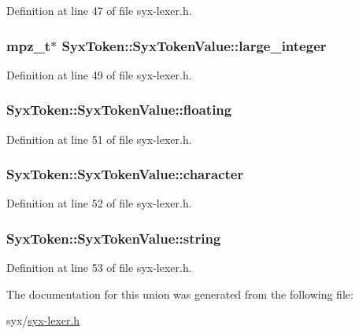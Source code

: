 Definition at line 47 of file syx-lexer.h.\hypertarget{union_syx_token_1_1_syx_token_value_746b44169806ed1ce69f218acdfd96a8}{
\subsubsection{\setlength{\rightskip}{0pt plus 5cm}mpz\_\-t$\ast$ SyxToken::SyxTokenValue::large\_\-integer}}
\label{union_syx_token_1_1_syx_token_value_746b44169806ed1ce69f218acdfd96a8}




Definition at line 49 of file syx-lexer.h.\hypertarget{union_syx_token_1_1_syx_token_value_8095519ab2c784b2b293d542c5da5a8d}{
\subsubsection{ SyxToken::SyxTokenValue::floating}}
\label{union_syx_token_1_1_syx_token_value_8095519ab2c784b2b293d542c5da5a8d}




Definition at line 51 of file syx-lexer.h.\hypertarget{union_syx_token_1_1_syx_token_value_4fa2b3de43d0695fd219dee73801d20e}{
\subsubsection{ SyxToken::SyxTokenValue::character}}
\label{union_syx_token_1_1_syx_token_value_4fa2b3de43d0695fd219dee73801d20e}




Definition at line 52 of file syx-lexer.h.\hypertarget{union_syx_token_1_1_syx_token_value_5470a0f27530896e0f104d948124df1c}{
\subsubsection{ SyxToken::SyxTokenValue::string}}
\label{union_syx_token_1_1_syx_token_value_5470a0f27530896e0f104d948124df1c}




Definition at line 53 of file syx-lexer.h.

The documentation for this union was generated from the following file:\begin{CompactItemize}
\item 
syx/\hyperlink{syx-lexer_8h}{syx-lexer.h}\end{CompactItemize}
